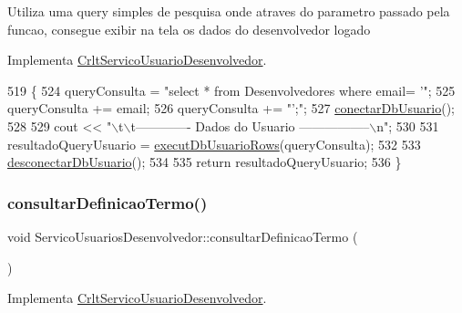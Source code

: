 Utiliza uma query simples de pesquisa onde atraves do parametro passado pela funcao, consegue exibir na tela os dados do desenvolvedor logado

Implementa \mbox{\hyperlink{class_crlt_servico_usuario_desenvolvedor_ad0e0d85a9a4763960f021fca4cf36f29}{Crlt\+Servico\+Usuario\+Desenvolvedor}}.


\begin{DoxyCode}
519 \{
524   queryConsulta = \textcolor{stringliteral}{"select * from Desenvolvedores where email= '"};
525   queryConsulta += email;
526   queryConsulta += \textcolor{stringliteral}{"';"};
527   \mbox{\hyperlink{comando_sql_8cpp_a4f89ddcbc4cf8f2587d89f72f8c7900d}{conectarDbUsuario}}();
528 
529   cout << \textcolor{stringliteral}{"\(\backslash\)t\(\backslash\)t------------- Dados do Usuario -----------------\(\backslash\)n"};
530 
531   resultadoQueryUsuario = \mbox{\hyperlink{comando_sql_8cpp_af54952694f2fa7d76f969fb74b853cb9}{executDbUsuarioRows}}(queryConsulta);
532 
533   \mbox{\hyperlink{comando_sql_8cpp_a969be9911913568e30d4ae8963338bc3}{desconectarDbUsuario}}();
534 
535   \textcolor{keywordflow}{return} resultadoQueryUsuario;
536 \}
\end{DoxyCode}
\mbox{\label{class_servico_usuarios_desenvolvedor_aa125405f5b747e4e7bbacebd28934e72}} 
\subsubsection{\texorpdfstring{consultar\+Definicao\+Termo()}{consultarDefinicaoTermo()}}
{\footnotesize\ttfamily void Servico\+Usuarios\+Desenvolvedor\+::consultar\+Definicao\+Termo (\begin{DoxyParamCaption}{ }\end{DoxyParamCaption})\hspace{0.3cm}{\ttfamily [virtual]}}



Implementa \mbox{\hyperlink{class_crlt_servico_usuario_desenvolvedor_acde5327b99fb4357276c4b0ab83fa20b}{Crlt\+Servico\+Usuario\+Desenvolvedor}}.



